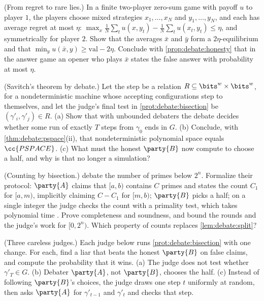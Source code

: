 \begin{refsection}
\begin{exercises}
\item \consolidation (From regret to rare lies.) In a finite two-player zero-sum game with payoff $u$ to player $1$, the players choose mixed strategies $x_1,\dots,x_N$ and $y_1,\dots,y_N$, and each has average regret at most $\eta$: $\max_x\frac1N\sum_tu(x,y_t)-\frac1N\sum_tu(x_t,y_t)\le\eta$, and symmetrically for player $2$. Show that the averages $\bar x$ and $\bar y$ form a $2\eta$-equilibrium and that $\min_yu(\bar x,y)\ge\mathrm{val}-2\eta$. Conclude with \cref{prop:debate:honesty} that in the answer game an opener who plays $\bar x$ states the false answer with probability at most $\eta$.\label{ex:debate:regret}

\item \variation (Savitch's theorem by debate.) Let the step be a relation $R\subseteq\bits^w\times\bits^w$, for a nondeterministic machine whose accepting configurations step to themselves, and let the judge's final test in \cref{prot:debate:bisection} be $(\gamma'_i,\gamma'_j)\in R$. (a) Show that with unbounded debaters the debate decides whether some run of exactly $T$ steps from $\gamma_0$ ends in $G$. (b) Conclude, with \cref{thm:debate:pspace}(ii), that nondeterministic polynomial space equals $\cc{PSPACE}$. (c) What must the honest $\party{B}$ now compute to choose a half, and why is that no longer a simulation?\label{ex:debate:savitch}

\item \variation (Counting by bisection.) \Textcite[\S2.2]{IrvingEtAl2018} debate the number of primes below $2^n$. Formalize their protocol: $\party{A}$ claims that $[a,b)$ contains $C$ primes and states the count $C_1$ for $[a,m)$, implicitly claiming $C-C_1$ for $[m,b)$; $\party{B}$ picks a half; on a single integer the judge checks the count with a primality test, which takes polynomial time \parencite{AgrawalKayalSaxena2004}. Prove completeness and soundness, and bound the rounds and the judge's work for $[0,2^n)$. Which property of counts replaces \cref{lem:debate:split}?\label{ex:debate:count}

\item \attack (Three careless judges.) Each judge below runs \cref{prot:debate:bisection} with one change. For each, find a liar that beats the honest $\party{B}$ on false claims, and compute the probability that it wins. (a) The judge does not test whether $\gamma'_T\in G$. (b) Debater $\party{A}$, not $\party{B}$, chooses the half. (c) Instead of following $\party{B}$'s choices, the judge draws one step $t$ uniformly at random, then asks $\party{A}$ for $\gamma'_{t-1}$ and $\gamma'_t$ and checks that step.\label{ex:debate:flaws}


\end{exercises}
\end{refsection}
